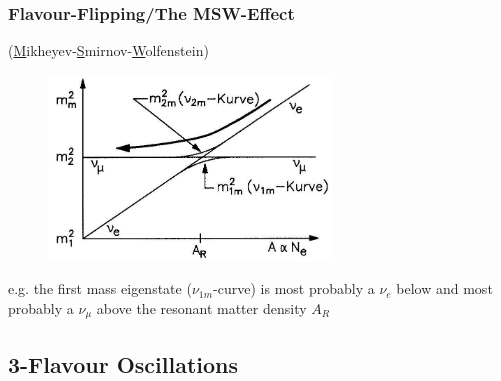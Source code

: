 \documentclass{beamer}
\begin{document}
\begin{frame}
  \frametitle{Flavour-Flipping/The MSW-Effect}

(\underline{M}ikheyev-\underline{S}mirnov-\underline{W}olfenstein)

\begin{figure}
    \begin{center}
      \includegraphics[width=7.5cm]{fig/resonant.jpg}
    \end{center}
  \end{figure}

e.g. the first mass eigenstate ($\nu_{1m}$-curve) is most probably a $\nu_e$ below and most probably a $\nu_{\mu}$ above the resonant matter density $A_R$
  
\end{frame}

\subsection{3-Flavour Oscillations }
\end{document}
